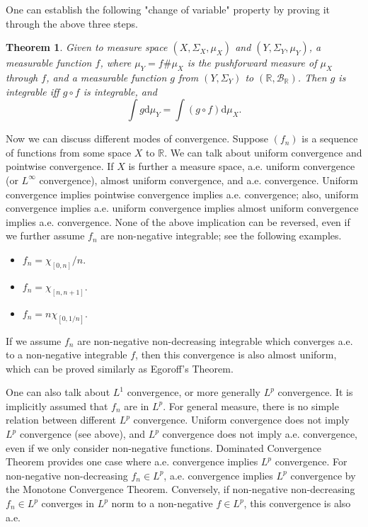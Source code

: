 \documentclass[openany]{book}
\newtheorem{theorem}{Theorem}[chapter]
\theoremstyle{definition}
\theoremstyle{remark}
\begin{document}
One can establish the following "change of variable" property by proving it through the above three steps.
\begin{theorem}
    Given to measure space $(X,\Sigma_X,\mu_X)$ and $(Y,\Sigma_Y,\mu_Y)$, a measurable function $f$, where $\mu_Y=f\#\mu_X$ is the pushforward measure of $\mu_X$ through $f$, and a measurable function $g$ from $(Y,\Sigma_Y)$ to $(\mathbb{R},\mathcal{B}_{\mathbb{R}})$. Then $g$ is integrable iff $g\circ f$ is integrable, and
    \begin{equation*}
        \int g \mathrm{d}\mu_Y=\int(g\circ f)\mathrm{d}\mu_X.
    \end{equation*}
\end{theorem}

Now we can discuss different modes of convergence. Suppose $(f_n)$ is a sequence of functions from some space $X$ to $\mathbb{R}$. We can talk about uniform convergence and pointwise convergence. If $X$ is further a measure space, a.e. uniform convergence (or $L^{\infty}$ convergence), almost uniform convergence, and a.e. convergence. Uniform convergence implies pointwise convergence implies a.e. convergence; also, uniform convergence implies a.e. uniform convergence implies almost uniform convergence implies a.e. convergence. None of the above implication can be reversed, even if we further assume $f_n$ are non-negative integrable; see the following examples.
\begin{itemize}
    \item $f_n=\chi_{[0,n]}/n$.
    \item $f_n=\chi_{[n,n+1]}$.
    \item $f_n=n\chi_{[0,1/n]}$.
\end{itemize}
If we assume $f_n$ are non-negative non-decreasing integrable which converges a.e. to a non-negative integrable $f$, then this convergence is also almost uniform, which can be proved similarly as Egoroff's Theorem.

One can also talk about $L^1$ convergence, or more generally $L^p$ convergence. It is implicitly assumed that $f_n$ are in $L^p$. For general measure, there is no simple relation between different $L^p$ convergence. Uniform convergence does not imply $L^p$ convergence (see above), and $L^p$ convergence does not imply a.e. convergence, even if we only consider non-negative functions. Dominated Convergence Theorem provides one case where a.e. convergence implies $L^p$ convergence. For non-negative non-decreasing $f_n\in L^p$, a.e. convergence implies $L^p$ convergence by the Monotone Convergence Theorem. Conversely, if non-negative non-decreasing $f_n\in L^p$ converges in $L^p$ norm to a non-negative $f\in L^p$, this convergence is also a.e.
\end{document}

